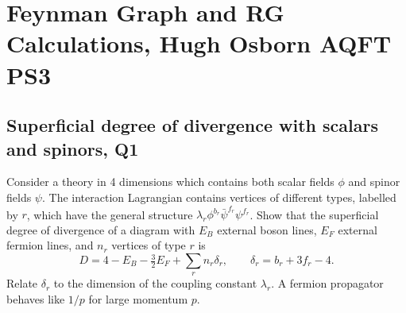 \section{Feynman Graph and RG Calculations, Hugh Osborn AQFT PS3}
\subsection{Superficial degree of divergence with scalars and spinors, Q1}
Consider a theory in 4 dimensions which contains both scalar fields $\phi$ and spinor fields $\psi$. The interaction Lagrangian contains vertices of different types, labelled by $r$, which have the general structure $\lambda_r\phi^{b_r}\bar\psi^{f_r}\psi^{f_r}$. Show that the superficial degree of divergence of a diagram with $E_B$ external boson lines, $E_F$ external fermion lines, and $n_r$ vertices of type $r$ is
\begin{equation}
    D = 4 - E_B - \tfrac{3}{2}E_F + \sum_r n_r\delta_r, \qquad \delta_r = b_r + 3f_r - 4.
\end{equation}
Relate $\delta_r$ to the dimension of the coupling constant $\lambda_r$. A fermion propagator behaves like $1/p$ for large momentum $p$.
